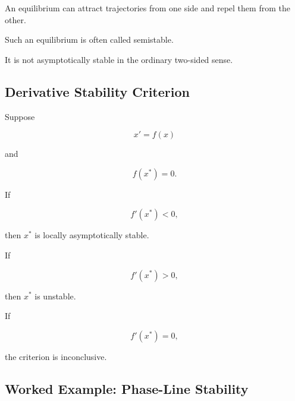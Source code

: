 An equilibrium can attract trajectories from one side and repel them from
the other.

Such an equilibrium is often called semistable.

It is not asymptotically stable in the ordinary two-sided sense.

\subsection{Derivative Stability Criterion}
\label{subsec:dynamical-derivative-stability}

Suppose

\[
x'=f(x)
\]

and

\[
f(x^*)=0.
\]

If

\[
\boxed{
f'(x^*)<0,
}
\]

then \(x^*\) is locally asymptotically stable.

If

\[
\boxed{
f'(x^*)>0,
}
\]

then \(x^*\) is unstable.

If

\[
\boxed{
f'(x^*)=0,
}
\]

the criterion is inconclusive.

\subsection{Worked Example: Phase-Line Stability}
\label{subsec:worked-phase-line-stability}

